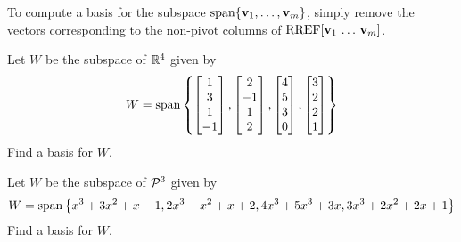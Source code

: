 \begin{applicationActivities}
\begin{fact}
  To compute a basis for the subspace \(\vspan\{\vect v_1,\dots,\vect v_m\}\),
  simply remove the vectors corresponding to the non-pivot columns of
  \(\RREF[\vect v_1\,\dots\,\vect v_m]\).
\end{fact}

\begin{activity}{10}
Let \(W\) be the subspace of \(\IR^4\) given by 
 \[W = \vspan \left\{
 \begin{bmatrix} 1 \\ 3 \\ 1 \\ -1 \end{bmatrix},
 \begin{bmatrix} 2 \\ -1 \\ 1 \\ 2 \end{bmatrix},
 \begin{bmatrix} 4 \\ 5 \\ 3 \\ 0 \end{bmatrix},
 \begin{bmatrix} 3 \\ 2 \\ 2 \\ 1 \end{bmatrix}
 \right\} \]
 Find a basis for \(W\).
\end{activity}

\begin{activity}{10}
Let \(W\) be the subspace of \(\P^3\) given by 
 \[W = \vspan \left\{x^3+3x^2+x-1, 2x^3-x^2+x+2, 4x^3+5x^3+3x, 3x^3+2x^2+2x+1 \right\} \]
 Find a basis for \(W\).
\end{activity}
\end{applicationActivities}
